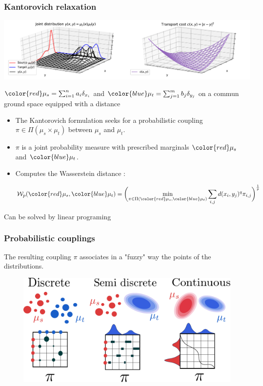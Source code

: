 \documentclass[french,9pt]{beamer}
\newcommand{\red}[1]{{\color{red} #1}}
\newcommand{\blue}[1]{{\color{blue} #1}}
\begin{document}
\begin{frame}
  \frametitle{Kantorovich relaxation}

  \begin{center}
      \includegraphics[width=0.9\linewidth]{fig/dist_kanto}
  \end{center}
$\red{\mu_{s}}=\sum_{i=1}^{n} a_{i} \delta_{x_{i}}$ and $\blue{\mu_{t}}=\sum_{j=1}^{m} b_{j} \delta_{y_{j}}$ on a commun ground space equipped with a distance

  \begin{itemize}

\item The Kantorovich formulation seeks for a probabilistic coupling $\pi \in \Pi(\mu_{s} \times \mu_{t})$ between
$\mu_{s}$ and $\mu_{t}$.
\item $\pi$ is a joint probability measure with prescribed
  marginals $\red{\mu_s}$ and $\blue{\mu_t}$.
\item Computes the Wasserstein distance :

\begin{equation}
\mathcal{W}_{p}(\red{\mu_{s}},\blue{\mu_{t}})=\bigg(\underset{\pi \in \Pi(\red{\mu_{s}},\blue{\mu_{t}})}{\min} \sum_{i,j} d(x_{i},y_{j})^{q} \pi_{i,j} \bigg)^{\frac{1}{p}}
\label{otwdiscrete}
\end{equation}

  \end{itemize}
Can be solved by linear programing
\end{frame}

\begin{frame}
  \frametitle{Probabilistic couplings}
  
  The resulting coupling $\pi$ associates in a "fuzzy" way the points of the distributions.
  
  \begin{figure}
  \begin{center}
      \includegraphics[width=0.9\linewidth]{fig/3ways.pdf}
  \end{center}
  \end{figure}
\end{frame}
\end{document}
